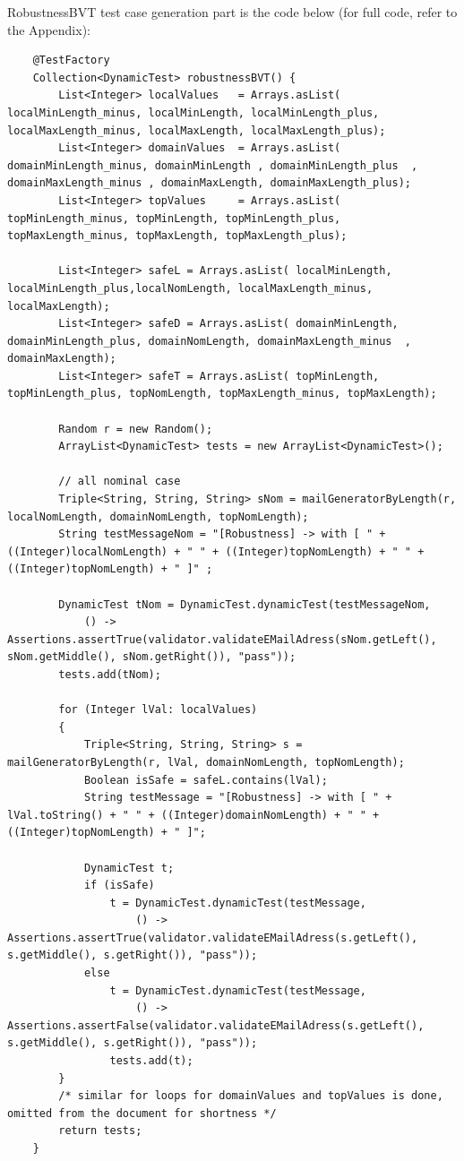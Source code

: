 \documentclass[a4paper,9pt,oneside]{scrreprt}
\begin{document}
\begin{enumerate}[a)]
		RobustnessBVT test case generation part is the code below (for full code, refer to the Appendix):
\begin{lstlisting}
	@TestFactory
	Collection<DynamicTest> robustnessBVT() {
		List<Integer> localValues	= Arrays.asList( localMinLength_minus, localMinLength, localMinLength_plus, localMaxLength_minus, localMaxLength, localMaxLength_plus);
		List<Integer> domainValues	= Arrays.asList( domainMinLength_minus, domainMinLength	, domainMinLength_plus	, domainMaxLength_minus	, domainMaxLength, domainMaxLength_plus);
		List<Integer> topValues		= Arrays.asList( topMinLength_minus, topMinLength, topMinLength_plus, topMaxLength_minus, topMaxLength, topMaxLength_plus);
		
		List<Integer> safeL	= Arrays.asList( localMinLength, localMinLength_plus,localNomLength, localMaxLength_minus, localMaxLength);
		List<Integer> safeD	= Arrays.asList( domainMinLength, domainMinLength_plus, domainNomLength, domainMaxLength_minus	, domainMaxLength);
		List<Integer> safeT	= Arrays.asList( topMinLength, topMinLength_plus, topNomLength, topMaxLength_minus, topMaxLength);
		
		Random r = new Random();
		ArrayList<DynamicTest> tests = new ArrayList<DynamicTest>();
		
		// all nominal case
		Triple<String, String, String> sNom = mailGeneratorByLength(r, localNomLength, domainNomLength, topNomLength);
		String testMessageNom = "[Robustness] -> with [ " + ((Integer)localNomLength) + " " + ((Integer)topNomLength) + " " +  ((Integer)topNomLength) + " ]" ;
		
		DynamicTest tNom = DynamicTest.dynamicTest(testMessageNom,
			() -> Assertions.assertTrue(validator.validateEMailAdress(sNom.getLeft(), sNom.getMiddle(), sNom.getRight()), "pass"));
		tests.add(tNom);
		
		for (Integer lVal: localValues) 
		{
			Triple<String, String, String> s = mailGeneratorByLength(r, lVal, domainNomLength, topNomLength);
			Boolean isSafe = safeL.contains(lVal);
			String testMessage = "[Robustness] -> with [ " + lVal.toString() + " " + ((Integer)domainNomLength) + " " + ((Integer)topNomLength) + " ]";
			
			DynamicTest t;
			if (isSafe)
				t = DynamicTest.dynamicTest(testMessage,
					() -> Assertions.assertTrue(validator.validateEMailAdress(s.getLeft(), s.getMiddle(), s.getRight()), "pass"));
			else
				t = DynamicTest.dynamicTest(testMessage,
					() -> Assertions.assertFalse(validator.validateEMailAdress(s.getLeft(), s.getMiddle(), s.getRight()), "pass"));
				tests.add(t);
		}
		/* similar for loops for domainValues and topValues is done, omitted from the document for shortness */
		return tests;
	}
\end{lstlisting}



\end{enumerate}
\end{document}
